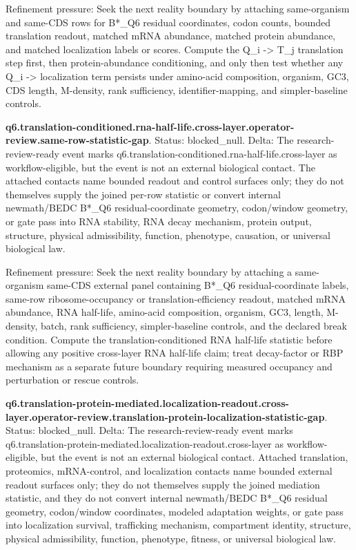 Refinement pressure: Seek the next reality boundary by attaching same-organism and same-CDS rows for B*\_Q6 residual coordinates, codon counts, bounded translation readout, matched mRNA abundance, matched protein abundance, and matched localization labels or scores. Compute the Q\_i -> T\_j translation step first, then protein-abundance conditioning, and only then test whether any Q\_i -> localization term persists under amino-acid composition, organism, GC3, CDS length, M-density, rank sufficiency, identifier-mapping, and simpler-baseline controls.

\textbf{q6.translation-conditioned.rna-half-life.cross-layer.operator-review.same-row-statistic-gap}. Status: blocked\_null. Delta: The research-review-ready event marks q6.translation-conditioned.rna-half-life.cross-layer as workflow-eligible, but the event is not an external biological contact. The attached contacts name bounded readout and control surfaces only; they do not themselves supply the joined per-row statistic or convert internal newmath/BEDC B*\_Q6 residual-coordinate geometry, codon/window geometry, or gate pass into RNA stability, RNA decay mechanism, protein output, structure, physical admissibility, function, phenotype, causation, or universal biological law.

Refinement pressure: Seek the next reality boundary by attaching a same-organism same-CDS external panel containing B*\_Q6 residual-coordinate labels, same-row ribosome-occupancy or translation-efficiency readout, matched mRNA abundance, RNA half-life, amino-acid composition, organism, GC3, length, M-density, batch, rank sufficiency, simpler-baseline controls, and the declared break condition. Compute the translation-conditioned RNA half-life statistic before allowing any positive cross-layer RNA half-life claim; treat decay-factor or RBP mechanism as a separate future boundary requiring measured occupancy and perturbation or rescue controls.

\textbf{q6.translation-protein-mediated.localization-readout.cross-layer.operator-review.translation-protein-localization-statistic-gap}. Status: blocked\_null. Delta: The research-review-ready event marks q6.translation-protein-mediated.localization-readout.cross-layer as workflow-eligible, but the event is not an external biological contact. Attached translation, proteomics, mRNA-control, and localization contacts name bounded external readout surfaces only; they do not themselves supply the joined mediation statistic, and they do not convert internal newmath/BEDC B*\_Q6 residual geometry, codon/window coordinates, modeled adaptation weights, or gate pass into localization survival, trafficking mechanism, compartment identity, structure, physical admissibility, function, phenotype, fitness, or universal biological law.

